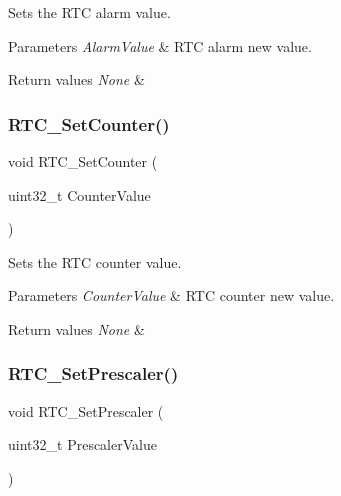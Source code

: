 Sets the R\+TC alarm value. 


\begin{DoxyParams}{Parameters}
{\em Alarm\+Value} & R\+TC alarm new value. \\
\hline
\end{DoxyParams}

\begin{DoxyRetVals}{Return values}
{\em None} & \\
\hline
\end{DoxyRetVals}
\mbox{\label{group___r_t_c___exported___functions_gafa81ec17158de1d1a7740eca81b9fb65}} 
\subsubsection{\texorpdfstring{RTC\_SetCounter()}{RTC\_SetCounter()}}
{\footnotesize\ttfamily void R\+T\+C\+\_\+\+Set\+Counter (\begin{DoxyParamCaption}\item[{uint32\+\_\+t}]{Counter\+Value }\end{DoxyParamCaption})}



Sets the R\+TC counter value. 


\begin{DoxyParams}{Parameters}
{\em Counter\+Value} & R\+TC counter new value. \\
\hline
\end{DoxyParams}

\begin{DoxyRetVals}{Return values}
{\em None} & \\
\hline
\end{DoxyRetVals}
\mbox{\label{group___r_t_c___exported___functions_gaf76be6071d1ba65b009e0791069e602c}} 
\subsubsection{\texorpdfstring{RTC\_SetPrescaler()}{RTC\_SetPrescaler()}}
{\footnotesize\ttfamily void R\+T\+C\+\_\+\+Set\+Prescaler (\begin{DoxyParamCaption}\item[{uint32\+\_\+t}]{Prescaler\+Value }\end{DoxyParamCaption})}



